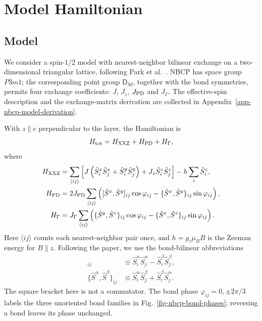 \clearpage

\section{Model Hamiltonian}\label{sec-nbcp-model-hamiltonian}

\subsection{Model}\label{sec-nbcp-model-symmetries}

We consider a spin-\(1/2\) model with nearest-neighbor bilinear exchange
on a two-dimensional triangular lattice, following
Park et al.~\cite{park2026}. NBCP has space group
\(P\overline{3}m1\); the corresponding point group \(\mathsf D_{3d}\),
together with the bond symmetries, permits four exchange coefficients:
\(J\), \(J_z\), \(J_{\rm PD}\) and \(J_\Gamma\).
The effective-spin description and the exchange-matrix derivation are
collected in Appendix~\ref{app-nbcp-model-derivation}.

With \(z\parallel c\) perpendicular to the layer, the Hamiltonian is
\begin{equation}\label{eq-nbcp-model-decomposition}
H_{\rm tot}=H_{\rm XXZ}+H_{\rm PD}+H_\Gamma,
\end{equation}
where
\begin{align*}
H_{\rm XXZ}&=\sum_{\langle ij\rangle}
\left[J\left(\hat S_i^x\hat S_j^x+\hat S_i^y\hat S_j^y\right)
+J_z\hat S_i^z\hat S_j^z\right]-h\sum_i\hat S_i^z,\\
H_{\rm PD}&=2J_{\rm PD}\sum_{\langle ij\rangle}
\left([\hat S^x,\hat S^y]_{ij}\cos\varphi_{ij}
-\{\hat S^x,\hat S^y\}_{ij}\sin\varphi_{ij}\right),\\
H_\Gamma&=J_\Gamma\sum_{\langle ij\rangle}
\left(\{\hat S^y,\hat S^z\}_{ij}\cos\varphi_{ij}
-\{\hat S^x,\hat S^z\}_{ij}\sin\varphi_{ij}\right).
\end{align*}
Here \(\langle ij\rangle\) counts each nearest-neighbor pair once, and
\(h=g_z\mu_B B\) is the Zeeman energy for \(B\parallel z\).
Following the paper, we use the bond-bilinear abbreviations
\begin{align*}
[\hat S^\alpha,\hat S^\beta]_{ij}
&\equiv\hat S_i^\alpha\hat S_j^\alpha-\hat S_i^\beta\hat S_j^\beta,\\
\{\hat S^\alpha,\hat S^\beta\}_{ij}
&\equiv\hat S_i^\alpha\hat S_j^\beta+\hat S_i^\beta\hat S_j^\alpha.
\end{align*}
The square bracket here is not a commutator. The bond phase
\(\varphi_{ij}=0,\pm2\pi/3\) labels the three unoriented bond families
in Fig.~\ref{fig-nbcp-bond-phases}; reversing a bond leaves its phase unchanged.

